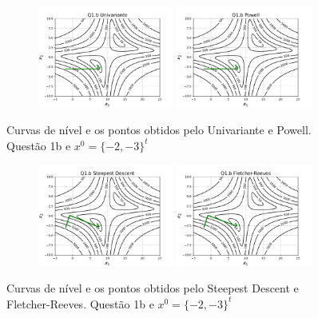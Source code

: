 \documentclass[10pt, a4paper]{article}
\begin{document}
\begin{figure}[H]
  \centering
  \begin{subfigure}[b]{\textwidth}
    \includegraphics[width=0.49\textwidth]{figuras/Q1.b_Univariante_P0=[-2e-3].pdf}
    \includegraphics[width=0.49\textwidth]{figuras/Q1.b_Powell_P0=[-2e-3].pdf}
  \end{subfigure}
  \caption{Curvas de nível e os pontos obtidos pelo Univariante e Powell. Questão 1b e $x^0 = \{-2,-3\}^t$}
\end{figure}

\begin{figure}[H]
  \centering
  \begin{subfigure}[b]{\textwidth}
    \includegraphics[width=0.49\textwidth]{figuras/Q1.b_Steepest Descent_P0=[-2e-3].pdf}
    \includegraphics[width=0.49\textwidth]{figuras/Q1.b_Fletcher-Reeves_P0=[-2e-3].pdf}
  \end{subfigure}
  \caption{Curvas de nível e os pontos obtidos pelo Steepest Descent e Fletcher-Reeves. Questão 1b e $x^0 = \{-2,-3\}^t$}
\end{figure}
\end{document}
